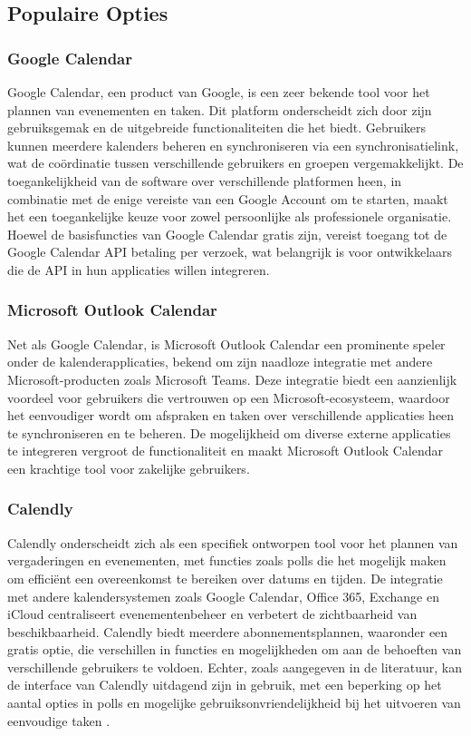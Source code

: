 \subsection{Populaire Opties}

\subsubsection{Google Calendar}
Google Calendar, een product van Google, is een zeer bekende tool voor het plannen van evenementen en taken. Dit platform onderscheidt zich door zijn gebruiksgemak en de uitgebreide functionaliteiten die het biedt. Gebruikers kunnen meerdere kalenders beheren en synchroniseren via een synchronisatielink, wat de coördinatie tussen verschillende gebruikers en groepen vergemakkelijkt. De toegankelijkheid van de software over verschillende platformen heen, in combinatie met de enige vereiste van een Google Account om te starten, maakt het een toegankelijke keuze voor zowel persoonlijke als professionele organisatie. Hoewel de basisfuncties van Google Calendar gratis zijn, vereist toegang tot de Google Calendar API betaling per verzoek, wat belangrijk is voor ontwikkelaars die de API in hun applicaties willen integreren.

\subsubsection{Microsoft Outlook Calendar}
Net als Google Calendar, is Microsoft Outlook Calendar een prominente speler onder de kalenderapplicaties, bekend om zijn naadloze integratie met andere Microsoft-producten zoals Microsoft Teams. Deze integratie biedt een aanzienlijk voordeel voor gebruikers die vertrouwen op een Microsoft-ecosysteem, waardoor het eenvoudiger wordt om afspraken en taken over verschillende applicaties heen te synchroniseren en te beheren. De mogelijkheid om diverse externe applicaties te integreren vergroot de functionaliteit en maakt Microsoft Outlook Calendar een krachtige tool voor zakelijke gebruikers.

\subsubsection{Calendly}
Calendly onderscheidt zich als een specifiek ontworpen tool voor het plannen van vergaderingen en evenementen, met functies zoals polls die het mogelijk maken om efficiënt een overeenkomst te bereiken over datums en tijden. De integratie met andere kalendersystemen zoals Google Calendar, Office 365, Exchange en iCloud centraliseert evenementenbeheer en verbetert de zichtbaarheid van beschikbaarheid. Calendly biedt meerdere abonnementsplannen, waaronder een gratis optie, die verschillen in functies en mogelijkheden om aan de behoeften van verschillende gebruikers te voldoen. Echter, zoals aangegeven in de literatuur, kan de interface van Calendly uitdagend zijn in gebruik, met een beperking op het aantal opties in polls en mogelijke gebruiksonvriendelijkheid bij het uitvoeren van eenvoudige taken \autocite{Kopcsanyi2023}.


